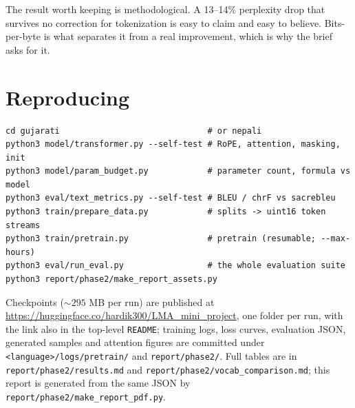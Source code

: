 \documentclass[11pt,a4paper]{article}
\begin{document}
The result worth keeping is methodological. A 13--14\% perplexity drop that
survives no correction for tokenization is easy to claim and easy to believe.
Bits-per-byte is what separates it from a real improvement, which is why the
brief asks for it.


\section{Reproducing}


\begin{verbatim}
cd gujarati                              # or nepali
python3 model/transformer.py --self-test # RoPE, attention, masking, init
python3 model/param_budget.py            # parameter count, formula vs model
python3 eval/text_metrics.py --self-test # BLEU / chrF vs sacrebleu
python3 train/prepare_data.py            # splits -> uint16 token streams
python3 train/pretrain.py                # pretrain (resumable; --max-hours)
python3 eval/run_eval.py                 # the whole evaluation suite
python3 report/phase2/make_report_assets.py
\end{verbatim}

Checkpoints (${\sim}295$ MB per run) are published at
\url{https://huggingface.co/hardik300/LMA\_mini\_project}, one folder per run,
with the link also in the top-level \texttt{README}; training logs, loss curves,
evaluation JSON, generated samples and attention figures are committed under
\texttt{<language>/logs/pretrain/} and \texttt{report/phase2/}. Full tables are in
\texttt{report/phase2/results.md} and \texttt{report/phase2/vocab\_comparison.md};
this report is generated from the same JSON by
\texttt{report/phase2/make\_report\_pdf.py}.
\end{document}
